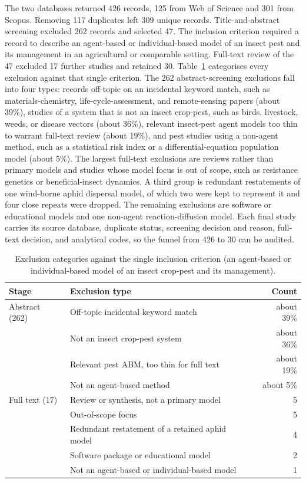 The two databases returned 426 records, 125 from Web of Science and 301 from Scopus. Removing 117 duplicates left 309 unique records. Title-and-abstract screening excluded 262 records and selected 47. The inclusion criterion required a record to describe an agent-based or individual-based model of an insect pest and its management in an agricultural or comparable setting. Full-text review of the 47 excluded 17 further studies and retained 30. Table~\ref{table:exclusions} categorises every exclusion against that single criterion. The 262 abstract-screening exclusions fall into four types: records off-topic on an incidental keyword match, such as materials-chemistry, life-cycle-assessment, and remote-sensing papers (about 39\%), studies of a system that is not an insect crop-pest, such as birds, livestock, weeds, or disease vectors (about 36\%), relevant insect-pest agent models too thin to warrant full-text review (about 19\%), and pest studies using a non-agent method, such as a statistical risk index or a differential-equation population model (about 5\%). The largest full-text exclusions are reviews rather than primary models and studies whose model focus is out of scope, such as resistance genetics or beneficial-insect dynamics. A third group is redundant restatements of one wind-borne aphid dispersal model, of which two were kept to represent it \citep{Wang2019,Koralewski2022} and four close repeats were dropped. The remaining exclusions are software or educational models and one non-agent reaction-diffusion model. Each final study carries its source database, duplicate status, screening decision and reason, full-text decision, and analytical codes, so the funnel from 426 to 30 can be audited.

\begin{table}[!htbp]
\vspace{2ex}
\centering
\caption{Exclusion categories against the single inclusion criterion (an agent-based or individual-based model of an insect crop-pest and its management).}
\label{table:exclusions}
\begin{tabular}{llr}
\hline\hline
Stage & Exclusion type & Count \\ \hline
Abstract (262) & Off-topic incidental keyword match & about 39\% \\
 & Not an insect crop-pest system & about 36\% \\
 & Relevant pest ABM, too thin for full text & about 19\% \\
 & Not an agent-based method & about 5\% \\
Full text (17) & Review or synthesis, not a primary model & 5 \\
 & Out-of-scope focus & 5 \\
 & Redundant restatement of a retained aphid model & 4 \\
 & Software package or educational model & 2 \\
 & Not an agent-based or individual-based model & 1 \\ \hline\hline
\end{tabular}
\vspace{2ex}
\end{table}


